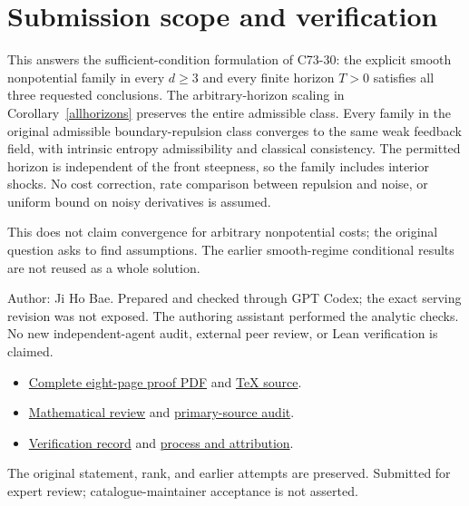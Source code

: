 \documentclass[11pt]{article}
\begin{document}
\section*{Submission scope and verification}
This answers the sufficient-condition formulation of C73-30: the explicit smooth nonpotential family in every $d\geq3$ and every finite horizon $T>0$ satisfies all three requested conclusions. The arbitrary-horizon scaling in Corollary~\ref{allhorizons} preserves the entire admissible class. Every family in the original admissible boundary-repulsion class converges to the same weak feedback field, with intrinsic entropy admissibility and classical consistency. The permitted horizon is independent of the front steepness, so the family includes interior shocks. No cost correction, rate comparison between repulsion and noise, or uniform bound on noisy derivatives is assumed.

This does not claim convergence for arbitrary nonpotential costs; the original question asks to find assumptions. The earlier smooth-regime conditional results are not reused as a whole solution.

Author: Ji Ho Bae. Prepared and checked through GPT Codex; the exact serving revision was not exposed. The authoring assistant performed the analytic checks. No new independent-agent audit, external peer review, or Lean verification is claimed.
\begin{itemize}
\item \href{https://github.com/jbaelaw/nonpotential-master-shock-selection/blob/4c9b0ae26e615c098b9044dd5ee0eca480222e1e/paper/Proof.pdf}{Complete eight-page proof PDF} and \href{https://github.com/jbaelaw/nonpotential-master-shock-selection/blob/4c9b0ae26e615c098b9044dd5ee0eca480222e1e/paper/Proof.tex}{TeX source}.
\item \href{https://github.com/jbaelaw/nonpotential-master-shock-selection/blob/4c9b0ae26e615c098b9044dd5ee0eca480222e1e/verification/Review.md}{Mathematical review} and \href{https://github.com/jbaelaw/nonpotential-master-shock-selection/blob/4c9b0ae26e615c098b9044dd5ee0eca480222e1e/verification/SourceAudit.md}{primary-source audit}.
\item \href{https://github.com/jbaelaw/nonpotential-master-shock-selection/blob/4c9b0ae26e615c098b9044dd5ee0eca480222e1e/verification/Verification.json}{Verification record} and \href{https://github.com/jbaelaw/nonpotential-master-shock-selection/blob/4c9b0ae26e615c098b9044dd5ee0eca480222e1e/provenance/Process.md}{process and attribution}.
\end{itemize}
The original statement, rank, and earlier attempts are preserved. Submitted for expert review; catalogue-maintainer acceptance is not asserted.
\end{document}
